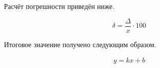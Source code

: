 Расчёт погрешности приведён ниже.

\begin{equation} %
  \delta = \frac{\Delta}{x} \cdot 100
  \label{eq:delta}
\end{equation}

Итоговое значение получено следующим образом.

\begin{gather} %
  y = kx + b
\end{gather}
